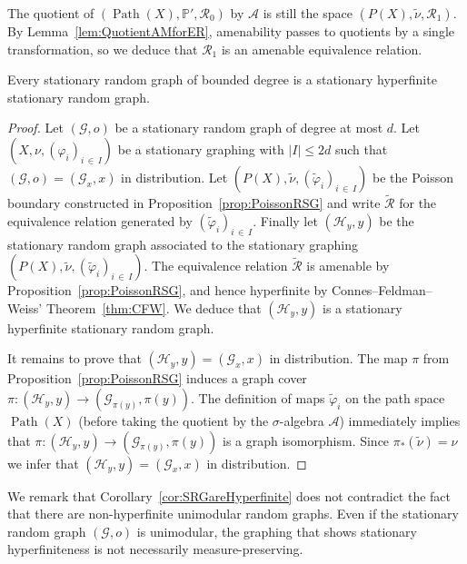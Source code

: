 \documentclass[AHL,Unicode,longabstracts,published]{cedram}
\DeclareMathOperator{\Path}{Path}
\newcommand{\bbP}{\mathbb{P}}
\newcommand{\calR}{\mathcal{R}}
\newcommand{\calA}{\mathcal{A}}
\newcommand{\calH}{\mathcal{H}}
\newcommand{\calG}{\mathcal{G}}
\begin{document}
The quotient of $(\Path(X),\bbP',\calR_0)$ by $\calA$ is still the space $(P(X),\widetilde{\nu},\calR_1)$. By Lemma~\ref{lem:QuotientAMforER}, amenability passes to quotients by a single transformation, so we deduce that $\calR_1$ is an amenable equivalence relation.

\begin{coro}\label{cor:SRGareHyperfinite}
Every stationary random graph of bounded degree is a stationary hyperfinite stationary random graph.
\end{coro}

\begin{proof}
Let $(\calG,o)$ be a stationary random graph of degree at most $d$. Let $(X,\nu,(\varphi_i)_{i\,\in\,I})$ be a stationary graphing with $|I|\leq 2d$ such that $(\calG,o)=(\calG_x,x)$ in distribution. Let $(P(X),\widetilde{\nu},(\widetilde\varphi_i)_{i\,\in\,I})$ be the Poisson boundary constructed in Proposition~\ref{prop:PoissonRSG} and write $\widetilde{\calR}$ for the equivalence relation generated by $(\widetilde\varphi_i)_{i\,\in\,I}$. Finally let $(\calH_y,y)$ be the stationary random graph associated to the stationary graphing $(P(X),\widetilde{\nu},(\widetilde{\varphi}_i)_{i\,\in\,I})$. The equivalence relation $\widetilde{\calR}$ is amenable by Proposition~\ref{prop:PoissonRSG}, and hence hyperfinite by Connes--Feldman--Weiss' Theorem~\ref{thm:CFW}. We deduce that $(\calH_y,y)$ is a stationary hyperfinite stationary random graph.

It remains to prove that $(\calH_y,y)=(\calG_x,x)$ in distribution. The map $\pi$ from Proposition~\ref{prop:PoissonRSG} induces a graph cover $\pi\colon (\calH_y, y)\to (\calG_{\pi(y)},\pi(y)).$ The definition of maps $\widetilde\varphi_i$ on the path space $\Path(X)$ (before taking the quotient by the $\sigma$-algebra $\calA$) immediately implies that $\pi\colon (\calH_y, y)\to (\calG_{\pi(y)},\pi(y))$ is a graph isomorphism. Since $\pi_*(\widetilde{\nu})=\nu$ we infer that $(\calH_y,y)=(\calG_x,x)$ in distribution.
\end{proof}

We remark that Corollary~\ref{cor:SRGareHyperfinite} does not contradict the fact that there are non-hyperfinite unimodular random graphs. Even if the stationary random graph $(\calG,o)$ is unimodular, the graphing that shows stationary hyperfiniteness is not necessarily measure-preserving.

\vspace*{20pt}

\break
\end{document}
